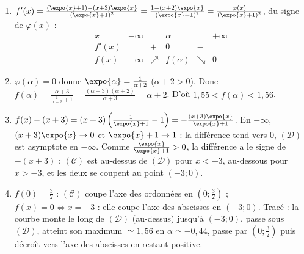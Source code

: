\begin{corrige}
\begin{sol}
\begin{enumerate}
      En $+\infty$ : $f(x) = \frac{(x+3)\expo{-x}}{1 + \expo{-x}}$ et $(x+3)\expo{-x} = x\expo{-x} + 3\expo{-x} \to 0$, donc
      $\lim_{x\to+\infty} f(x) = 0$ : l'axe des abscisses ($y = 0$) est asymptote horizontale \`a $(\mathcal{C})$ en $+\infty$.
\item $f'(x) = \frac{(\expo{x}+1) - (x+3)\expo{x}}{(\expo{x}+1)^2} = \frac{1 - (x+2)\expo{x}}{(\expo{x}+1)^2} = \frac{\varphi(x)}{(\expo{x}+1)^2}$,
      du signe de $\varphi(x)$ :
      \[
      \begin{array}{c|ccccc}
      x & -\infty & & \alpha & & +\infty \\ \hline
      f'(x) & & + & 0 & - & \\ \hline
      f(x) & -\infty & \nearrow & f(\alpha) & \searrow & 0
      \end{array}
      \]
\item $\varphi(\alpha) = 0$ donne $\expo{\alpha} = \frac{1}{\alpha+2}$ ($\alpha + 2 > 0$). Donc
      $f(\alpha) = \frac{\alpha + 3}{\frac{1}{\alpha+2} + 1} = \frac{(\alpha+3)(\alpha+2)}{\alpha + 3} = \alpha + 2$.
      D'o\`u $\boxed{1{,}55 < f(\alpha) < 1{,}56}$.
\item $f(x) - (x+3) = (x+3)\left(\frac{1}{\expo{x}+1} - 1\right) = -\frac{(x+3)\expo{x}}{\expo{x}+1}$.
      En $-\infty$, $(x+3)\expo{x} \to 0$ et $\expo{x}+1 \to 1$ : la diff\'erence tend vers $0$, $(\mathcal{D})$ est asymptote en $-\infty$.
      Comme $\frac{\expo{x}}{\expo{x}+1} > 0$, la diff\'erence a le signe de $-(x+3)$ : $(\mathcal{C})$ est au-dessus de $(\mathcal{D})$
      pour $x < -3$, au-dessous pour $x > -3$, et les deux se coupent au point $(-3 ; 0)$.
\item $f(0) = \frac{3}{2}$ : $(\mathcal{C})$ coupe l'axe des ordonn\'ees en $\left(0 ; \frac{3}{2}\right)$ ;
      $f(x) = 0 \iff x = -3$ : elle coupe l'axe des abscisses en $(-3 ; 0)$.
      Trac\'e : la courbe monte le long de $(\mathcal{D})$ (au-dessus) jusqu'\`a $(-3;0)$, passe sous $(\mathcal{D})$, atteint son maximum
      $\simeq 1{,}56$ en $\alpha \simeq -0{,}44$, passe par $\left(0;\frac{3}{2}\right)$ puis d\'ecro\^it vers l'axe des abscisses en restant positive.
\end{enumerate}
\end{sol}


\end{corrige}

